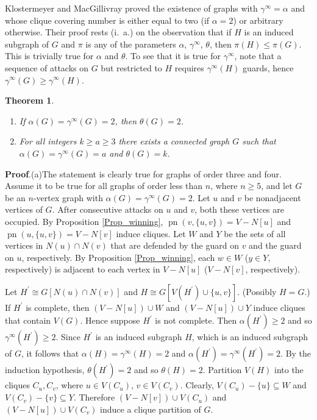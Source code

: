 \documentclass[12pt]{article}%
\newtheorem{theorem}{Theorem}[section]
\begin{document}
Klostermeyer and MacGillivray \cite{klos1} proved the existence of graphs with
$\gamma^{\infty}=\alpha$ and whose clique covering number is either equal to
two (if $\alpha=2$) or arbitrary otherwise. Their proof rests (i.~a.) on the
observation that if $H$ is an induced subgraph of $G$ and $\pi$ is any of the
parameters $\alpha$, $\gamma^{\infty}$, $\theta$, then $\pi(H)\leq\pi(G)$.
This is trivially true for $\alpha$ and $\theta$. To see that it is true for
$\gamma^{\infty}$, note that a sequence of attacks on $G$ but restricted to
$H$ requires $\gamma^{\infty}(H)$ guards, hence $\gamma^{\infty}(G)\geq
\gamma^{\infty}(H)$.

\begin{theorem}
\label{Thm_equal_LB}\emph{\cite{klos1}}

\begin{enumerate}
\item[\emph{(a)}] If $\alpha(G)=\gamma^{\infty}(G)=2$, then $\theta(G)=2$.

\item[\emph{(b)}] For all integers $k\geq a\geq3$ there exists a connected
graph $G$ such that $\alpha(G)=\gamma^{\infty}(G)=a$ and $\theta(G)=k$.
\end{enumerate}
\end{theorem}

\noindent\textbf{Proof}.\hspace{0.1in}(a)\hspace{0.1in}The statement is
clearly true for graphs of order three and four. Assume it to be true for all
graphs of order less than $n$, where $n\geq5$, and let $G$ be an $n$-vertex
graph with $\alpha(G)=\gamma^{\infty}(G)=2$. Let $u$ and $v$ be nonadjacent
vertices of $G$. After consecutive attacks on $u$ and $v$, both these vertices
are occupied. By Proposition \ref{Prop_winning}, $\operatorname{pn}%
(v,\{u,v\})=V-N[u]$ and $\operatorname{pn}(u,\{u,v\})=V-N[v]$ induce cliques.
Let $W$ and $Y$ be the sets of all vertices in $N(u)\cap N(v)$ that are
defended by the guard on $v$ and the guard on $u$, respectively. By
Proposition \ref{Prop_winning}, each $w\in W$ ($y\in Y$, respectively) is
adjacent to each vertex in $V-N[u]$ ($V-N[v]$, respectively).

Let $H^{\prime}\cong G[N(u)\cap N(v)]$ and $H\cong G[V(H^{\prime}%
)\cup\{u,v\}]$. (Possibly $H=G$.) If $H^{\prime}$ is complete, then
$(V-N[u])\cup W$ and $(V-N[u])\cup Y$ induce cliques that contain $V(G)$.
Hence suppose $H^{\prime}$ is not complete. Then $\alpha(H^{\prime})\geq2$ and
so $\gamma^{\infty}(H^{\prime})\geq2$. Since $H^{\prime}$ is an induced
subgraph $H$, which is an induced subgraph of $G$, it follows that
$\alpha(H)=\gamma^{\infty}(H)=2$ and $\alpha(H^{\prime})=\gamma^{\infty
}(H^{\prime})=2$. By the induction hypothesis, $\theta(H^{\prime})=2$ and so
$\theta(H)=2$. Partition $V(H)$ into the cliques $C_{u},C_{v}$, where $u\in
V(C_{u})$, $v\in V(C_{v})$. Clearly, $V(C_{u})-\{u\}\subseteq W$ and
$V(C_{v})-\{v\}\subseteq Y$. Therefore $(V-N[v])\cup V(C_{u})$ and
$(V-N[u])\cup V(C_{v})$ induce a clique partition of $G$.
\end{document}
